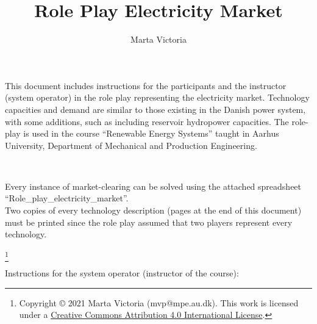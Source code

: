 \documentclass[3p]{elsarticle} %
\newcommand\blfootnote[1]{
  \begingroup
  \renewcommand\thefootnote{}\footnote{#1}
  \addtocounter{footnote}{-1}
  \endgroup
}
\begin{document}
\begin{frontmatter}

\title{ \textbf{Role Play Electricity Market}}

\author[mymainaddress]{Marta Victoria}
\address[mymainaddress]{Department of Mechanical and Production Engineering, Aarhus University, Inge Lehmanns Gade 10, 8000 Aarhus, Denmark}

\end{frontmatter}
\thispagestyle{fancy}



This document includes instructions for the participants and the instructor (system operator) in the role play representing the electricity market. Technology capacities and demand are similar to those existing in the Danish power system, with some additions, such as including reservoir hydropower capacities. The role-play is used in the course “Renewable Energy Systems” taught in Aarhus University, Department of Mechanical and Production Engineering.

\

Every instance of market-clearing can be solved using the attached spreadsheet “Role\_play\_electricity\_market”.\\

Two copies of every technology description (pages at the end of this document) must be printed since the role play assumed that two players represent every technology.

\blfootnote{Copyright © 2021 Marta Victoria (mvp@mpe.au.dk). This work is licensed under a \href{https://creativecommons.org/licenses/by/4.0/} {Creative Commons Attribution 4.0 International License}.}


\newpage


Instructions for the system operator (instructor of the course):
\end{document}
